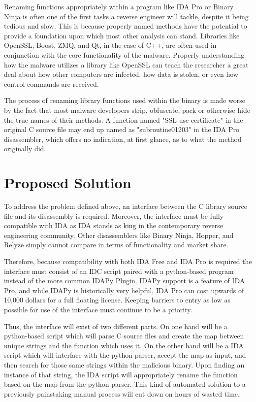 \documentclass[10pt, draftclsnofoot, letterpaper, margin=.75in, onecolumn]{IEEEtran}
\begin{document}
\par Renaming functions appropriately within a program like IDA Pro or Binary Ninja is often one of the first tasks a reverse engineer will tackle, despite it being tedious and slow. This is because properly named methods have the potential to provide a foundation upon which most other analysis can stand. Libraries like OpenSSL, Boost, ZMQ, and Qt, in the case of C++, are often used in conjunction with the core functionality of the malware. Properly understanding how the malware utilizes a library like OpenSSL can teach the researcher a great deal about how other computers are infected, how data is stolen, or even how control commands are received.\\

\par The process of renaming library functions used within the binary is made worse by the fact that most malware developers strip, obfuscate, pack or otherwise hide the true names of their methods. A function named "SSL use certificate" in the original C source file may end up named as "subroutine01203" in the IDA Pro disassembler, which offers no indication, at first glance, as to what the method originally did.\\

\section{Proposed Solution}
To address the problem defined above, an interface between the C library source file and its disassembly is required. Moreover, the interface must be fully compatible with IDA as IDA stands as king in the contemporary reverse engineering community. Other disassemblers like Binary Ninja, Hopper, and Relyze simply cannot compare in terms of functionality and market share.\\

\par Therefore, because compatibility with both IDA Free and IDA Pro is required the interface must consist of an IDC script paired with a python-based program instead of the more common IDAPy Plugin. IDAPy support is a feature of IDA Pro, and while IDAPy is historically very helpful, IDA Pro can cost upwards of 10,000 dollars for a full floating license. Keeping barriers to entry as low as possible for use of the interface must continue to be a priority.\\

\par Thus, the interface will exist of two different parts. On one hand will be a python-based script which will parse C source files and create the map between unique strings and the function which uses it. On the other hand will be a IDA script which will interface with the python parser, accept the map as input, and then search for those same strings within the malicious binary. Upon finding an instance of that string, the IDA script will appropriately rename the function based on the map from the python parser. This kind of  automated solution to a previously painstaking manual process will cut down on hours of wasted time.
\end{document}
